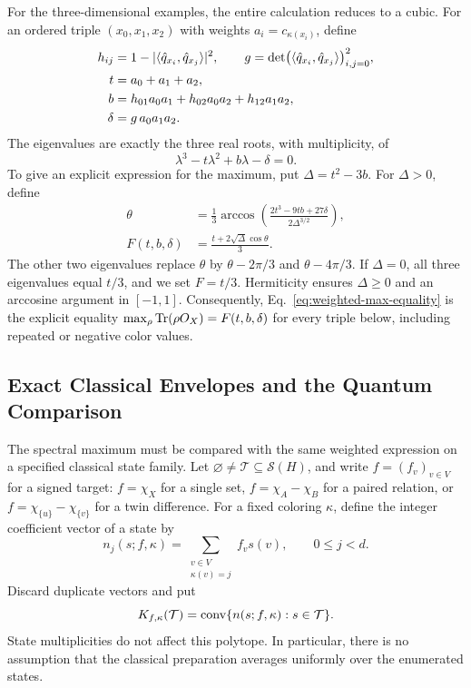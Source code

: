 \documentclass[aps,pra,reprint,superscriptaddress,longbibliography,nofootinbib,floatfix,10pt]{revtex4-2}
\theoremstyle{definition}\newtheorem{definition}[theorem]{Definition}
\theoremstyle{remark}\newtheorem{remark}[theorem]{Remark}
\newcommand{\Sc}{\mathcal S}\newcommand{\Cc}{\mathcal C}\newcommand{\Wc}{\mathcal W}
\begin{document}
For the three-dimensional examples, the entire calculation reduces to a cubic. For an ordered triple $(x_0,x_1,x_2)$ with weights $a_i=c_{\kappa(x_i)}$, define
\begin{equation}\label{eq:weighted-triple-coefficients}
\begin{aligned}
h_{ij}&=1-|\langle \hat q_{x_i},\hat q_{x_j}\rangle|^2,\qquad
g=\det\bigl(\langle \hat q_{x_i},\hat q_{x_j}\rangle\bigr)_{i,j=0}^2,\\
t&=a_0+a_1+a_2,\\
b&=h_{01}a_0a_1+h_{02}a_0a_2+h_{12}a_1a_2,\\
\delta&=g\,a_0a_1a_2.
\end{aligned}
\end{equation}
The eigenvalues are exactly the three real roots, with multiplicity, of
\begin{equation}\label{eq:weighted-cubic}
\lambda^3-t\lambda^2+b\lambda-\delta=0.
\end{equation}
To give an explicit expression for the maximum, put $\Delta=t^2-3b$. For $\Delta>0$, define
\begin{equation}\label{eq:weighted-cubic-maximum}
\begin{aligned}
\theta&=\frac13\arccos\!\left(
\frac{2t^3-9tb+27\delta}{2\Delta^{3/2}}\right),\\
F(t,b,\delta)&=\frac{t+2\sqrt\Delta\cos\theta}{3}.
\end{aligned}
\end{equation}
The other two eigenvalues replace $\theta$ by $\theta-2\pi/3$ and $\theta-4\pi/3$. If $\Delta=0$, all three eigenvalues equal $t/3$, and we set $F=t/3$. Hermiticity ensures $\Delta\ge0$ and an arccosine argument in $[-1,1]$. Consequently, Eq.~\eqref{eq:weighted-max-equality} is the explicit equality $\max_\rho\operatorname{Tr}(\rho O_X)=F(t,b,\delta)$ for every triple below, including repeated or negative color values.

\subsection{Exact Classical Envelopes and the Quantum Comparison}\label{sec:classical-envelopes}

The spectral maximum must be compared with the same weighted expression on a specified classical state family. Let $\varnothing\ne\mathcal T\subseteq\Sc(H)$, and write $f=(f_v)_{v\in V}$ for a signed target: $f=\chi_X$ for a single set, $f=\chi_A-\chi_B$ for a paired relation, or $f=\chi_{\{u\}}-\chi_{\{v\}}$ for a twin difference. For a fixed coloring $\kappa$, define the integer coefficient vector of a state by
\begin{equation}\label{eq:classical-color-vector}
n_j(s;f,\kappa)=\sum_{\substack{v\in V\\\kappa(v)=j}}f_vs(v),
\qquad 0\le j<d.
\end{equation}
Discard duplicate vectors and put
\begin{equation}\label{eq:classical-color-polytope}
K_{f,\kappa}(\mathcal T)=\operatorname{conv}\{n(s;f,\kappa):s\in\mathcal T\}.
\end{equation}
State multiplicities do not affect this polytope. In particular, there is no assumption that the classical preparation averages uniformly over the enumerated states.
\end{document}
